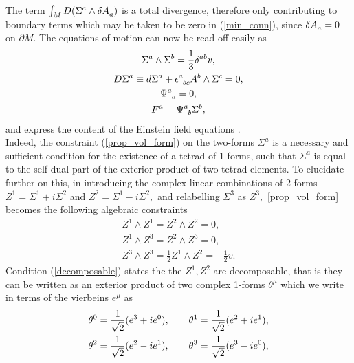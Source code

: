 \documentclass[a4paper,12pt, onecolumn, notitlepage]{article}
\theoremstyle{definition}
\theoremstyle{remark}
\newcommand{\m}{\mu}
\newcommand{\e}{\epsilon}
\begin{document}
The term $\int_{M} D(\Sigma\indices{^a}\wedge\delta A\indices{_a})$ is a total divergence, therefore only contributing to boundary terms which may be taken to be zero in (\ref{min_conn}), since $\delta A\indices{_a}=0$ on $\partial M.$ The equations of motion can now be read off easily as
\begin{subequations}
	\begin{gather}
\label{prop_vol_form}
\Sigma^{a}\wedge\Sigma^{b} = \frac{1}{3}\delta^{ab}v,\\
\label{cov_derivative}
D\Sigma^{a} \equiv d\Sigma^{a} + \e\indices{^a_b_c}A^{b}\wedge\Sigma^{c} = 0,\\
\label{traceless}
\Psi\indices{^a_a} = 0,\\
\label{weyl}
F^{a} = \Psi\indices{^a_b}\Sigma^{b},
	\end{gather}
\end{subequations}
and express the content of the Einstein field equations \cite{capovilla_1989, capovilla_1993}.\\
Indeed, the constraint (\ref{prop_vol_form}) on the two-forms $\Sigma^{a}$ is a necessary and sufficient condition for the existence of a tetrad of 1-forms, such that $\Sigma^{a}$ is equal to the self-dual part of the exterior product of two tetrad elements.
To elucidate further on this, in introducing the complex linear combinations of 2-forms $Z^{1} = \Sigma^{1}+ i\Sigma^{2}$ and $Z^{2} = \Sigma^{1}- i\Sigma^{2},$ and relabelling $\Sigma^{3}$ as $Z^{3},$ \cref{prop_vol_form} becomes the following algebraic constraints
\begin{subequations}
	\begin{gather}
	\label{decomposable}
	Z^{1}\wedge Z^{1}=Z^{2}\wedge Z^{2}=0,\\
	\label{orthogonal}
	Z^{1}\wedge Z^{3}= Z^{2}\wedge Z^{3}=0,\\
	\label{frame}
	Z^{3}\wedge Z^{3}=\frac{1}{2}Z^{1}\wedge Z^{2}=-\frac{1}{2}v.
	\end{gather}
\end{subequations}
Condition (\ref{decomposable}) states the the $Z^{1}, Z^{2}$ are decomposable, that is they can be written as an exterior product of two complex 1-forms $\theta^{\m}$ which we write in terms of the vierbeins $e^{\mu}$ as
\begin{gather*}
\theta\indices{^0}=\frac{1}{\sqrt{2}}(e\indices{^3}+ie\indices{^0}),\qquad\theta\indices{^1}=\frac{1}{\sqrt{2}}(e\indices{^2}+ie\indices{^1}),\\
\theta\indices{^2}=\frac{1}{\sqrt{2}}(e\indices{^2}-ie\indices{^1}),\qquad\theta\indices{^3}=\frac{1}{\sqrt{2}}(e\indices{^3}-ie\indices{^0}),
\end{gather*}
\end{document}

